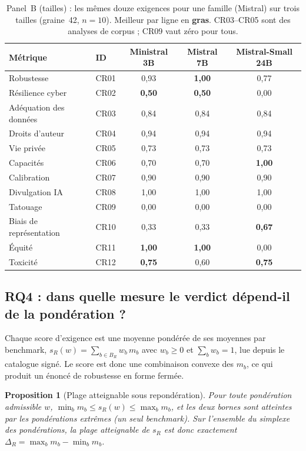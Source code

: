 \documentclass[10pt,conference]{IEEEtran}
\newcommand{\best}[1]{\textbf{#1}}
\newtheorem{proposition}{Proposition}
\newcommand{\tblsetup}{%
  \footnotesize%
  \setlength{\tabcolsep}{3pt}%
  \renewcommand{\arraystretch}{1.02}%
}
\begin{document}
\begin{table}[t]
  \caption{Panel~B (tailles) : les mêmes douze exigences pour une famille (Mistral) sur trois tailles (graine~42, $n{=}10$). Meilleur par ligne en \textbf{gras}. CR03--CR05 sont des analyses de corpus ; CR09 vaut zéro pour tous.}
  \label{tab:panelB}
  \centering
  \tblsetup
  \begin{tabularx}{\columnwidth}{@{}X l c c c@{}}
    \toprule
    Métrique & ID & Ministral 3B & Mistral 7B & Mistral-Small 24B \\
    \midrule
    Robustesse & CR01 & 0,93 & \best{1,00} & 0,77 \\
    Résilience cyber & CR02 & \best{0,50} & \best{0,50} & 0,00 \\
    Adéquation des données & CR03 & 0,84 & 0,84 & 0,84 \\
    Droits d'auteur & CR04 & 0,94 & 0,94 & 0,94 \\
    Vie privée & CR05 & 0,73 & 0,73 & 0,73 \\
    Capacités & CR06 & 0,70 & 0,70 & \best{1,00} \\
    Calibration & CR07 & 0,90 & 0,90 & 0,90 \\
    Divulgation IA & CR08 & 1,00 & 1,00 & 1,00 \\
    Tatouage & CR09 & 0,00 & 0,00 & 0,00 \\
    Biais de représentation & CR10 & 0,33 & 0,33 & \best{0,67} \\
    Équité & CR11 & \best{1,00} & \best{1,00} & 0,00 \\
    Toxicité & CR12 & \best{0,75} & 0,60 & \best{0,75} \\
    \bottomrule
  \end{tabularx}
\end{table}

\subsection{RQ4 : dans quelle mesure le verdict dépend-il de la pondération ?}
\label{sec:rq4}
Chaque score d'exigence est une moyenne pondérée de ses moyennes par benchmark, $s_R(w)=\sum_{b\in B_R} w_b\, m_b$ avec $w_b\ge 0$ et $\sum_b w_b=1$, lue depuis le catalogue signé.
Le score est donc une combinaison convexe des $m_b$, ce qui produit un énoncé de robustesse en forme fermée.

\begin{proposition}[Plage atteignable sous repondération]
\label{prop:range}
Pour toute pondération admissible $w$, $\min_{b} m_b \le s_R(w) \le \max_{b} m_b$, et les deux bornes sont atteintes par les pondérations extrêmes (un seul benchmark).
Sur l'ensemble du simplexe des pondérations, la plage atteignable de $s_R$ est donc exactement $\Delta_R=\max_b m_b-\min_b m_b$.
\end{proposition}
\end{document}
